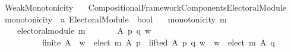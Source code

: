 %
\begin{isabellebody}%
%
%
\isadelimtheory
%
\endisadelimtheory
%
\isatagtheory
{}\isamarkupfalse%
\ Weak{\isacharunderscore}{\kern0pt}Monotonicity\isanewline
\ \ \ {\isachardoublequoteopen}{\isachardot}{\kern0pt}{\isachardot}{\kern0pt}{\isacharslash}{\kern0pt}Compositional{\isacharunderscore}{\kern0pt}Framework{\isacharslash}{\kern0pt}Components{\isacharslash}{\kern0pt}Electoral{\isacharunderscore}{\kern0pt}Module{\isachardoublequoteclose}\isanewline
\isanewline
{}%
\endisatagtheory
{\isafoldtheory}%
%
\isadelimtheory
\isanewline
%
\endisadelimtheory
\isanewline
\isanewline
{}\isamarkupfalse%
\ monotonicity\ {\isacharcolon}{\kern0pt}{\isacharcolon}{\kern0pt}\ {\isachardoublequoteopen}{\isacharprime}{\kern0pt}a\ Electoral{\isacharunderscore}{\kern0pt}Module\ {\isasymRightarrow}\ bool{\isachardoublequoteclose}\ \isanewline
\ \ {\isachardoublequoteopen}monotonicity\ m\ {\isasymequiv}\isanewline
\ \ \ \ electoral{\isacharunderscore}{\kern0pt}module\ m\ {\isasymand}\isanewline
\ \ \ \ \ \ {\isacharparenleft}{\kern0pt}{\isasymforall}A\ p\ q\ w{\isachardot}{\kern0pt}\isanewline
\ \ \ \ \ \ \ \ \ \ {\isacharparenleft}{\kern0pt}finite\ A\ {\isasymand}\ w\ {\isasymin}\ elect\ m\ A\ p\ {\isasymand}\ lifted\ A\ p\ q\ w{\isacharparenright}{\kern0pt}\ {\isasymlongrightarrow}\ w\ {\isasymin}\ elect\ m\ A\ q{\isacharparenright}{\kern0pt}{\isachardoublequoteclose}\isanewline
%
\isadelimtheory
\isanewline
%
\endisadelimtheory
%
\isatagtheory
{}\isamarkupfalse%
%
\endisatagtheory
{\isafoldtheory}%
%
\isadelimtheory
%
\endisadelimtheory
%
\end{isabellebody}%
\endinput
